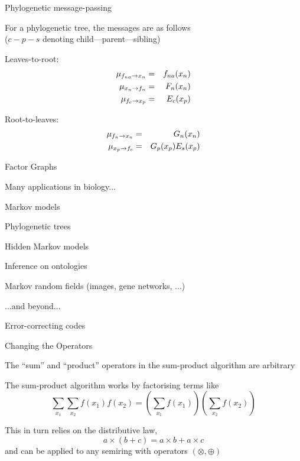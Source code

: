 \documentclass{beamer}
\begin{document}
\begin{frame}{Phylogenetic message-passing}

 For a phylogenetic tree, the messages are as follows \\ ($c-p-s$ denoting child---parent---sibling)
  \itemb
  \item Leaves-to-root:
\begin{eqnarray*}
\mu_{f_{na} \to x_n} & = & f_{na}(x_n) \\
\mu_{x_n \to f_n} & = & F_n(x_n) \\
\mu_{f_c \to x_p} & = & E_c(x_p)
\end{eqnarray*}
  \item Root-to-leaves: 
\begin{eqnarray*}
\mu_{f_n \to x_n} & = & G_n(x_n) \\
\mu_{x_p \to f_c} & = & G_p(x_p) E_s(x_p)
\end{eqnarray*}
  \iteme
\end{frame}

\PYandPXY


\begin{frame}{Factor Graphs}
\itemb
\item Many applications in biology...
 \itemb
 \item Markov models
 \item Phylogenetic trees
 \item Hidden Markov models
 \item Inference on ontologies
 \item Markov random fields (images, gene networks, ...)
 \iteme
\item ...and beyond...
 \itemb
 \item Error-correcting codes

 \iteme
\iteme
\end{frame}


\begin{frame}{Changing the Operators}
\itemb
\item The ``sum'' and ``product'' operators in the sum-product algorithm are arbitrary
 \itemb
 \item The sum-product algorithm works by factorising terms like
\[
\sum_{x_1} \sum_{x_2} f(x_1)f(x_2) = \left( \sum_{x_1} f(x_1) \right) \left( \sum_{x_2} f(x_2) \right)
\]
 \item This in turn relies on the distributive law,
\[
a \times (b+c)=a \times b + a \times c
\]
and can be applied to any semiring with operators $(\otimes,\oplus)$
  \iteme
\iteme
\end{frame}
\end{document}
